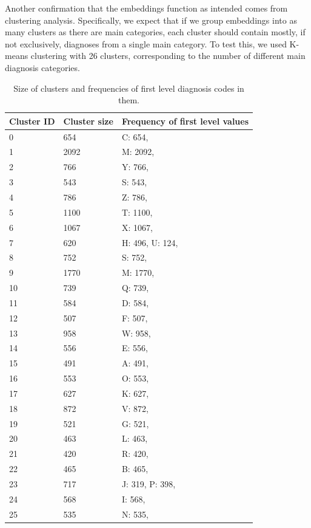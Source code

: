 Another confirmation that the embeddings function as intended comes from clustering analysis. Specifically, we expect that if we group embeddings into as many clusters as there are main categories, each cluster should contain mostly, if not exclusively, diagnoses from a single main category. To test this, we used K-means clustering with 26 clusters, corresponding to the number of different main diagnosis categories.

\begin{table}[!h]
	\centering
	\begin{tabular}{|p{}|p{}|p{}|}
		\hline
		Cluster ID & Cluster size & Frequency of first level values \\ \hline
		0 & 654 & C: 654, \\ \hline
		1 & 2092 & M: 2092, \\ \hline
		2 & 766 & Y: 766, \\ \hline
		3 & 543 & S: 543, \\ \hline
		4 & 786 & Z: 786, \\ \hline
		5 & 1100 & T: 1100, \\ \hline
		6 & 1067 & X: 1067, \\ \hline
		7 & 620 & H: 496, U: 124, \\ \hline
		8 & 752 & S: 752, \\ \hline
		9 & 1770 & M: 1770, \\ \hline
		10 & 739 & Q: 739, \\ \hline
		11 & 584 & D: 584, \\ \hline
		12 & 507 & F: 507, \\ \hline
		13 & 958 & W: 958, \\ \hline
		14 & 556 & E: 556, \\ \hline
		15 & 491 & A: 491, \\ \hline
		16 & 553 & O: 553, \\ \hline
		17 & 627 & K: 627, \\ \hline
		18 & 872 & V: 872, \\ \hline
		19 & 521 & G: 521, \\ \hline
		20 & 463 & L: 463, \\ \hline
		21 & 420 & R: 420, \\ \hline
		22 & 465 & B: 465, \\ \hline
		23 & 717 & J: 319, P: 398, \\ \hline
		24 & 568 & I: 568, \\ \hline
		25 & 535 & N: 535, \\ \hline
	\end{tabular}
	\caption{Size of clusters and frequencies of first level diagnosis codes in them.}
	\label{tab:diag_clusters}
\end{table}

